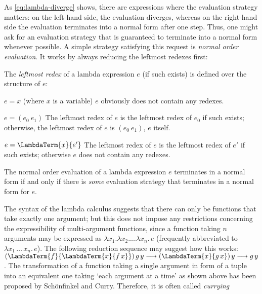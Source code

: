 As \eqref{eq:lambda-diverge} shows, there are expressions where the evaluation
strategy matters: on the left-hand side, the evaluation diverges, whereas on the
right-hand side the evaluation terminates into a normal form after one
step. Thus, one might ask for an evaluation strategy that is guaranteed to
terminate into a normal form whenever possible. A simple strategy satisfying
this request is \emph{normal order evaluation}. It works by always reducing the
leftmost redexes first:
\begin{defn}
The \emph{leftmost redex} of a lambda expression $e$ (if such exists) is defined
over the structure of $e$:
\begin{listcase}
\item[$e = x$ (where $x$ is a variable)]
 $e$ obviously does not contain any redexes.

\item[$e = (e_0\ e_1)$]
The leftmost redex of $e$ is the leftmost redex of $e_0$ if such exists;
otherwise, the leftmost redex of $e$ is $(e_0\ e_1)$, \IE $e$ itself.

\item[$e = \LambdaTerm{x}{e'}$]
The leftmost redex of $e$ is the leftmost redex of $e'$ if such exists;
otherwise $e$ does not contain any redexes.
\end{listcase}
\end{defn}

\begin{prop}
  The normal order evaluation of a lambda expression $e$ terminates in a normal
  form if and only if there is \emph{some} evaluation strategy that terminates
  in a normal form for $e$.
\end{prop}

\begin{rem}
\label{rem:multi-argument}
The syntax of the lambda calculus suggests that there can only be functions that
take exactly one argument; but this does not impose any restrictions concerning
the expressibility of multi-argument functions, since a function taking $n$
arguments may be expressed as $\lambda x_1.\lambda x_2.\ldots\lambda x_n.\,e$ (frequently abbreviated
to $\lambda x_1\,\ldots \,x_n.\, e$). The following reduction sequence may suggest how this
works: $(\LambdaTerm{f}{\LambdaTerm{x}{f\,x}})\,g\,y \longrightarrow (\LambdaTerm{x}{g\,x})\,
y \longrightarrow g\,y$. The transformation of a function taking a single argument in form of
a tuple into an equivalent one taking `each argument at a time' as shown above
has been proposed by Sch\"onfinkel and Curry. Therefore, it is often called
\emph{currying}
\end{rem}

